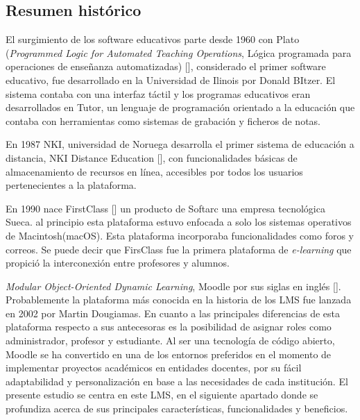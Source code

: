 \subsection{Resumen histórico}
El surgimiento de los software educativos parte desde 1960 con Plato (\textit{Programmed Logic for Automated Teaching Operations}, Lógica programada para operaciones de enseñanza automatizadas) [\cite{Wiki_Plato}], considerado el primer software educativo, fue desarrollado en la Universidad de Ilinois por Donald BItzer. El sistema contaba con una interfaz táctil y los programas educativos eran desarrollados en Tutor, un lenguaje de programación orientado a la educación que contaba con herramientas como sistemas de grabación y ficheros de notas.  

En 1987 NKI, universidad de Noruega desarrolla el primer sistema de educación a distancia, NKI Distance Education [\cite{NKI}], con funcionalidades básicas de almacenamiento de recursos en línea, accesibles por todos los usuarios pertenecientes a la plataforma.  

En 1990 nace FirstClass [\cite{FirstClass}] un producto de Softarc una empresa tecnológica Sueca. al principio esta plataforma estuvo enfocada a solo los sistemas operativos de Macintosh(macOS). Esta plataforma incorporaba funcionalidades como foros y correos. Se puede decir que FirsClass fue la primera plataforma de \textit{e-learning} que propició la interconexión entre profesores y alumnos.  

\textit{Modular Object-Oriented Dynamic Learning}, Moodle por sus siglas en inglés [\cite{Moodle_docs}]. Probablemente la plataforma más conocida en la historia de los LMS fue lanzada en 2002 por Martin Dougiamas. En cuanto a las principales diferencias de esta plataforma respecto a sus antecesoras es la posibilidad de asignar roles como administrador, profesor y estudiante. Al ser una tecnología de código abierto, Moodle se ha convertido en una de los entornos preferidos en el momento de implementar proyectos académicos en entidades docentes, por su fácil adaptabilidad y personalización en base a las necesidades de cada institución. El presente estudio se centra en este LMS, en el siguiente apartado donde se profundiza acerca de sus principales características, funcionalidades y beneficios.  


